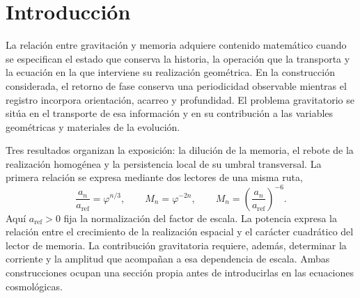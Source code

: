 
\begin{abstract}
Se desarrolla la relación entre memoria orientada, geometría gravitatoria
y evolución cosmológica desde la construcción APP--TRIT--TPK. El recorrido
demostrativo articula la ley de dilución \(a^{-6}\), la existencia y
unicidad del umbral de rebote en la realización homogénea especificada y la
persistencia local del rebote transversal bajo perturbaciones controladas.
La memoria conserva orientación, acarreo e historia durante el retorno de
fase; su transporte admite realizaciones operatorias y geométricas que
preservan esas distinciones. El paso hacia la dinámica gravitatoria reúne
la corriente de pantalla, el funcional de amplitud torsional, su
normalización y su compatibilidad con el refinamiento. En la acción mínima
de Cartan--Holst, la torsión queda determinada algebraicamente por la
corriente de espín y evoluciona con la geometría y los campos materiales.
Los balances cosmológicos conservan las condiciones de las fuentes y de
los acoplamientos en cada carta. El desarrollo se completa con la
información de horizonte, las operaciones de lectura del observador y la
respuesta relacional del estado conjunto.
\end{abstract}

\section{Introducción}
\label{vii:sec:introduccion}

La relación entre gravitación y memoria adquiere contenido matemático
cuando se especifican el estado que conserva la historia, la operación que
la transporta y la ecuación en la que interviene su realización geométrica.
En la construcción considerada, el retorno de fase conserva una
periodicidad observable mientras el registro incorpora orientación,
acarreo y profundidad. El problema gravitatorio se sitúa en el transporte
de esa información y en su contribución a las variables geométricas y
materiales de la evolución.

Tres resultados organizan la exposición: la dilución de la memoria, el
rebote de la realización homogénea y la persistencia local de su umbral
transversal. La primera relación se expresa mediante dos lectores de una
misma ruta,
\begin{equation}
 \frac{a_n}{a_{\mathrm{ref}}}=\varphi^{n/3},
 \qquad M_n=\varphi^{-2n},
 \qquad
 M_n=\left(\frac{a_n}{a_{\mathrm{ref}}}\right)^{-6}.
 \label{vii:eq:programa-dilucion}
\end{equation}
Aquí \(a_{\mathrm{ref}}>0\) fija la normalización del factor de escala.
La potencia expresa la relación entre el crecimiento de la realización
espacial y el carácter cuadrático del lector de memoria. La contribución
gravitatoria requiere, además, determinar la corriente y la amplitud que
acompañan a esa dependencia de escala. Ambas construcciones ocupan una
sección propia antes de introducirlas en las ecuaciones cosmológicas.

